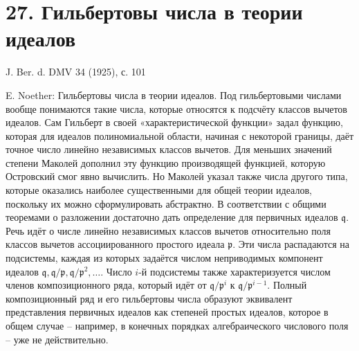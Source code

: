 \documentclass[11pt]{article}
\begin{document}
\section*{27. Гильбертовы числа в теории идеалов}

\begin{center}
J. Ber. d. DMV 34 (1925), с. 101
\end{center}

E. Noether: Гильбертовы числа в теории идеалов. Под гильбертовыми числами вообще понимаются такие числа, которые относятся к подсчёту классов вычетов идеалов. Сам Гильберт в своей «характеристической функции» задал функцию, которая для идеалов полиномиальной области, начиная с некоторой границы, даёт точное число линейно независимых классов вычетов. Для меньших значений степени Маколей дополнил эту функцию производящей функцией, которую Островский смог явно вычислить. Но Маколей указал также числа другого типа, которые оказались наиболее существенными для общей теории идеалов, поскольку их можно сформулировать абстрактно. В соответствии с общими теоремами о разложении достаточно дать определение для первичных идеалов $\mathfrak q$. Речь идёт о числе линейно независимых классов вычетов относительно поля классов вычетов ассоциированного простого идеала $\mathfrak p$. Эти числа распадаются на подсистемы, каждая из которых задаётся числом неприводимых компонент идеалов $\mathfrak q,\mathfrak q/\mathfrak p,\mathfrak q/\mathfrak p^2,\ldots$. Число $i$-й подсистемы также характеризуется числом членов композиционного ряда, который идёт от $\mathfrak q/\mathfrak p^i$ к $\mathfrak q/\mathfrak p^{i-1}$. Полный композиционный ряд и его гильбертовы числа образуют эквивалент представления первичных идеалов как степеней простых идеалов, которое в общем случае -- например, в конечных порядках алгебраического числового поля -- уже не действительно.
\end{document}

